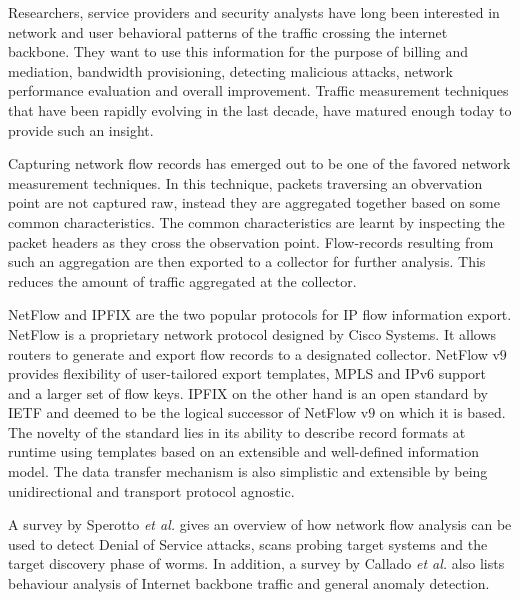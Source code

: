 Researchers, service providers and security analysts have long been interested
in network and user behavioral patterns of the traffic crossing the internet
backbone. They want to use this information for the purpose of billing and
mediation, bandwidth provisioning, detecting malicious attacks, network
performance evaluation and overall improvement. Traffic measurement techniques
that have been rapidly evolving in the last decade, have matured enough today
to provide such an insight.

Capturing network flow records has emerged out to be one of the favored
network measurement techniques. In this technique, packets traversing an
obvervation point are not captured raw, instead they are aggregated together
based on some common characteristics. The common characteristics are learnt by
inspecting the packet headers as they cross the observation point.
Flow-records resulting from such an aggregation are then exported to a
collector for further analysis. This reduces the amount of traffic aggregated
at the collector.

NetFlow and \ac{IPFIX} are the two popular protocols for IP flow information
export. NetFlow \cite{rfc3954} is a proprietary network protocol designed by
Cisco Systems. It allows routers to generate and export flow records to a
designated collector. NetFlow v$9$ provides flexibility of user-tailored
export templates, \ac{MPLS} and IPv$6$ support and a larger set of flow keys.
\ac{IPFIX} \cite{rfc5101} on the other hand is an open standard by IETF and
deemed to be the logical successor of NetFlow v$9$ on which it is based. The
novelty of the standard lies in its ability to describe record formats at
runtime using templates based on an extensible and well-defined information
model. The data transfer mechanism is also simplistic and extensible by being
unidirectional and transport protocol agnostic.


A survey by Sperotto \textit{et al.} \cite{sperotto:2010} gives an overview of
how network flow analysis can be used to detect Denial of Service attacks,
scans probing target systems and the target discovery phase of worms. In
addition, a survey by Callado \textit{et al.} \cite{callado:2009} also lists
behaviour analysis of Internet backbone traffic and general anomaly detection.


